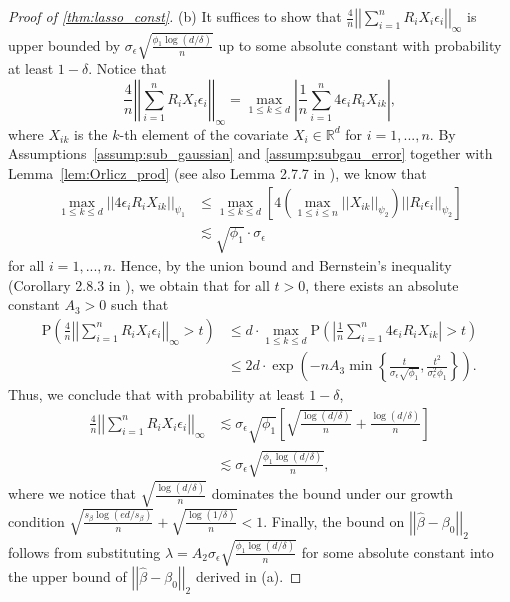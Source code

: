 \documentclass[ejsv2,noshowframe]{imsart}
\theoremstyle{plain}
\theoremstyle{definition}
\theoremstyle{remark}
\newcommand{\norm}[1]{\left|\left| #1 \right|\right|}
\renewcommand{\hat}{\widehat}
\begin{document}
\begin{proof}[Proof of \autoref{thm:lasso_const}]
	\noindent(b) It suffices to show that $\frac{4}{n}\norm{\sum_{i=1}^n R_iX_i\epsilon_i}_{\infty}$ is upper bounded by $\sigma_{\epsilon} \sqrt{\frac{\phi_1 \log(d/\delta)}{n}}$ up to some absolute constant with probability at least $1-\delta$. Notice that
	$$\frac{4}{n}\norm{\sum_{i=1}^n R_iX_i\epsilon_i}_{\infty} = \max_{1\leq k \leq d} \left|\frac{1}{n} \sum_{i=1}^n 4\epsilon_i R_iX_{ik} \right|,$$
	where $X_{ik}$ is the $k$-th element of the covariate $X_i\in \mathbb{R}^d$ for $i=1,...,n$. By Assumptions~\ref{assump:sub_gaussian} and \ref{assump:subgau_error} together with Lemma~\ref{lem:Orlicz_prod} (see also Lemma 2.7.7 in \citealt{vershynin2018high}), we know that
	\begin{align*}
		\max_{1\leq k \leq d} \norm{4\epsilon_iR_i X_{ik}}_{\psi_1} &\leq \max_{1\leq k \leq d} \left[4\left(\max_{1\leq i\leq n} \norm{X_{ik}}_{\psi_2}\right) \norm{R_i \epsilon_i}_{\psi_2} \right]\\ 
		&\lesssim \sqrt{\phi_1} \cdot \sigma_{\epsilon}
	\end{align*}
	for all $i=1,...,n$. Hence, by the union bound and Bernstein's inequality (Corollary 2.8.3 in \citealt{vershynin2018high}), we obtain that for all $t>0$, there exists an absolute constant $A_3>0$ such that
	\begin{align*}
		\mathrm{P}\left(\frac{4}{n}\norm{\sum_{i=1}^n R_iX_i\epsilon_i}_{\infty} > t \right) &\leq d \cdot \max_{1\leq k \leq d} \mathrm{P}\left(\left|\frac{1}{n} \sum_{i=1}^n 4\epsilon_i R_i X_{ik} \right| > t \right)\\
		&\leq 2d \cdot \exp\left(-nA_3 \min\left\{\frac{t}{\sigma_{\epsilon} \sqrt{\phi_1}}, \frac{t^2}{\sigma_{\epsilon}^2\phi_1} \right\} \right).
	\end{align*}
	Thus, we conclude that with probability at least $1-\delta$,
	\begin{align*}
		\frac{4}{n}\norm{\sum_{i=1}^n R_iX_i\epsilon_i}_{\infty} &\lesssim \sigma_{\epsilon}\sqrt{\phi_1} \left[\sqrt{\frac{\log(d/\delta)}{n}} + \frac{\log(d/\delta)}{n} \right]\\
		&\lesssim \sigma_{\epsilon}\sqrt{\frac{\phi_1\log(d/\delta)}{n}},
	\end{align*}
	where we notice that $\sqrt{\frac{\log(d/\delta)}{n}}$ dominates the bound under our growth condition $\sqrt{\frac{s_{\beta}\log(ed/s_{\beta})}{n}} + \sqrt{\frac{\log(1/\delta)}{n}}<1$. Finally, the bound on $\norm{\hat{\beta} - \beta_0}_2$ follows from substituting $\lambda =A_2 \sigma_{\epsilon}\sqrt{\frac{\phi_1\log(d/\delta)}{n}}$ for some absolute constant into the upper bound of $\norm{\hat{\beta} -\beta_0}_2$ derived in (a).
\end{proof}
\end{document}

